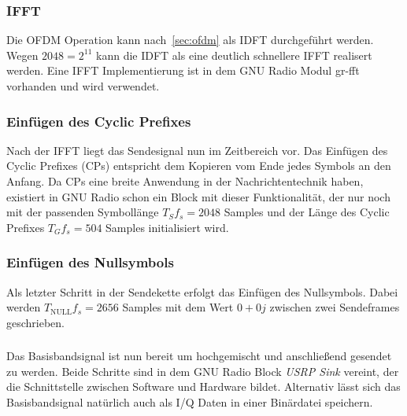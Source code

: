 \subsubsection{\ac{IFFT}}
Die OFDM Operation kann nach~\ref{sec:ofdm} als \ac{IDFT} durchgeführt werden. Wegen $2048 = 2^{11}$ kann die IDFT als eine deutlich schnellere IFFT realisert werden. Eine IFFT Implementierung ist in dem GNU Radio Modul \glqq gr-fft\grqq{} vorhanden \cite{repo:gr-fft} und wird verwendet.

\subsubsection{Einfügen des Cyclic Prefixes}
Nach der IFFT liegt das Sendesignal nun im Zeitbereich vor. Das Einfügen des Cyclic Prefixes (CPs) entspricht dem Kopieren vom Ende jedes Symbols an den Anfang. Da CPs eine breite Anwendung in der Nachrichtentechnik haben, existiert in GNU Radio schon ein Block mit dieser Funktionalität, der nur noch mit der passenden Symbollänge $T_S f_s = 2048$ Samples und der Länge des Cyclic Prefixes $T_G f_s = 504$ Samples initialisiert wird.

\subsubsection{Einfügen des Nullsymbols}
Als letzter Schritt in der Sendekette erfolgt das Einfügen des Nullsymbols. Dabei werden $T_{\text{NULL}} f_s =2656$ Samples mit dem Wert $0+0j$ zwischen zwei Sendeframes geschrieben.

\subsubsection{}
Das Basisbandsignal ist nun bereit um hochgemischt und anschließend gesendet zu werden. Beide Schritte sind in dem GNU Radio Block \textit{USRP Sink} vereint, der die Schnittstelle zwischen Software und Hardware bildet. Alternativ lässt sich das Basisbandsignal natürlich auch als I/Q Daten in einer Binärdatei speichern.
